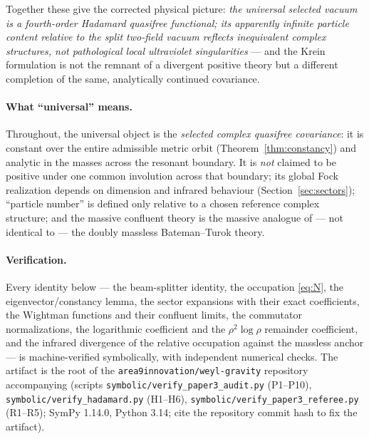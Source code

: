 \documentclass[11pt]{article}
\theoremstyle{definition}
\theoremstyle{remark}
\begin{document}
Together these give the corrected physical picture: \emph{the universal
selected vacuum is a fourth-order Hadamard quasifree functional; its
apparently infinite particle content relative to the split two-field
vacuum reflects inequivalent complex structures, not pathological local
ultraviolet singularities} --- and the Krein formulation is not the
remnant of a divergent positive theory but a different completion of the
same, analytically continued covariance.

\paragraph{What ``universal'' means.}
Throughout, the universal object is the \emph{selected complex quasifree
covariance}: it is constant over the entire admissible metric orbit
(Theorem~\ref{thm:constancy}) and analytic in the masses across the
resonant boundary.  It is \emph{not} claimed to be positive under one
common involution across that boundary; its global Fock realization
depends on dimension and infrared behaviour
(Section~\ref{sec:sectors}); ``particle number'' is defined only
relative to a chosen reference complex structure; and the massive
confluent theory is the massive analogue of --- not identical to --- the
doubly massless Bateman--Turok theory.

\paragraph{Verification.}
Every identity below --- the beam-splitter identity, the occupation
\eqref{eq:N}, the eigenvector/constancy lemma, the sector expansions with
their exact coefficients, the Wightman functions and their confluent
limits, the commutator normalizations, the logarithmic coefficient and
the $\rho^2\log\rho$ remainder coefficient, and the infrared divergence
of the relative occupation against the massless anchor ---
is machine-verified symbolically, with independent numerical checks.
The artifact is the root of the \texttt{area9innovation/weyl-gravity}
repository accompanying \cite{companion1,companion2} (scripts
\texttt{symbolic/verify\_paper3\_audit.py} (P1--P10),
\texttt{symbolic/verify\_hadamard.py} (H1--H6),
\texttt{symbolic/verify\_paper3\_referee.py} (R1--R5); SymPy 1.14.0,
Python 3.14; cite the repository commit hash to fix the artifact).
\end{document}
